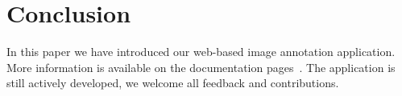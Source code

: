 \section{Conclusion}

In this paper we have introduced our web-based image annotation application.
More information is available on the documentation pages~\cite{annotationappdoc}.
The application is still actively developed, we welcome all feedback and contributions.

